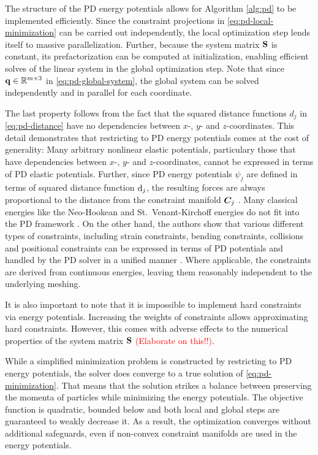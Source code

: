 The structure of the PD energy potentials allows for Algorithm \ref{alg:pd} to be implemented efficiently. Since the constraint projections
in \autoref{eq:pd-local-minimization} can be carried out independently, the local optimization step lends itself to massive parallelization. 
Further, because the system matrix $\mathbf{S}$ is constant, its prefactorization can be computed at initialization, enabling
efficient solves of the linear system in the global optimization step. Note that since $\mathbf{q} \in \mathbb{R}^{m \times 3}$ in \autoref{eq:pd-global-system}, 
the global system can be solved independently and in parallel for each coordinate.

The last property follows from the fact that the squared distance functions $d_j$ in \autoref{eq:pd-distance} have no dependencies between 
$x$-, $y$- and $z$-coordinates. This detail demonstrates that restricting to PD energy potentials comes at the cost of generality: 
Many arbitrary nonlinear elastic potentials, particulary those that have dependencies between $x$-, $y$- and $z$-coordinates, cannot be expressed 
in terms of PD elastic potentials. Further, since PD energy potentials $\psi_j$ are defined in terms of squared distance function $\mathrm{d}_j$, the 
resulting forces are always proportional to the distance from the constraint manifold $\bm{C}_j$ \cite{overby2017}. Many classical energies 
like the Neo-Hookean 
and St.\ Venant-Kirchoff energies do not fit into the PD framework \cite{liu2017}. On the other hand, the authors show that various different 
types of constraints, including strain constraints, bending constraints, collisions and positional constraints can be expressed in terms of PD 
potentials and handled by the PD solver in a unified manner \cite{bouaziz2014}. Where applicable, the constraints are derived from continuous 
energies, leaving them reasonably independent to the underlying meshing.

It is also important to note that it is impossible to implement hard constraints via energy potentials. Increasing
the weights of constraints allows approximating hard constraints. However, this comes with adverse effects to the numerical properties of the 
system matrix $\mathbf{S}$ \textcolor{red}{(Elaborate on this!!)}.

While a simplified minimization problem is constructed by restricting to PD energy potentials, the solver does converge to a 
true solution of \autoref{eq:pd-minimization}. That means that the solution strikes a balance between preserving 
the momenta of particles while minimizing the energy potentials. The objective function is quadratic, bounded below and both local and 
global steps are guaranteed to weakly decrease it. As a result, the optimization converges without additional safeguards, even if 
non-convex constraint manifolds are used in the energy potentials.

